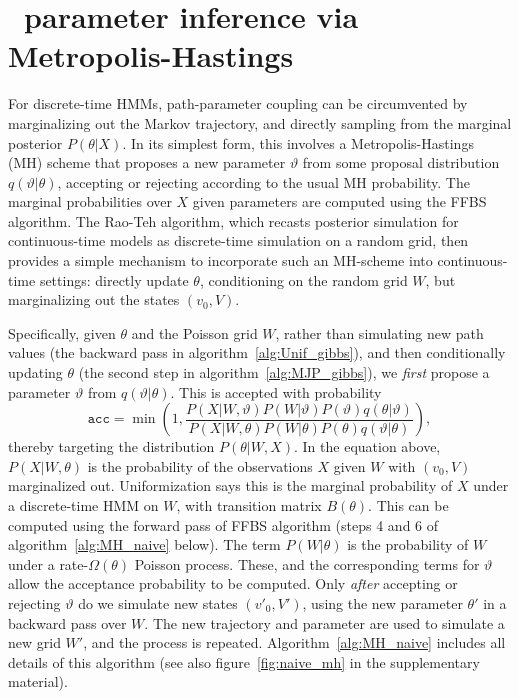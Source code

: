 \vspace{-.2in}
\section{\Naive\ parameter inference via Metropolis-Hastings}
For discrete-time HMMs, path-parameter coupling can be circumvented by marginalizing out the Markov trajectory, and directly sampling from the marginal posterior $P(\theta|X)$.
In its simplest form, this involves a Metropolis-Hastings (MH) scheme that proposes a new parameter $\vartheta$ from some proposal distribution $q(\vartheta|\theta)$, accepting or rejecting according to the usual MH probability.
The marginal probabilities over $X$ given parameters are computed using the FFBS algorithm.
The Rao-Teh algorithm, which recasts posterior simulation for continuous-time models as discrete-time simulation on a random grid, then provides a simple mechanism to incorporate such an MH-scheme into continuous-time settings: directly update $\theta$, conditioning on the random grid $W$, but marginalizing out the states $(v_0, V)$.

Specifically, given $\theta$ and the Poisson grid $W$, rather than simulating new path values (the backward pass in algorithm~\ref{alg:Unif_gibbs}), and then conditionally updating $\theta$ (the second step in algorithm~\ref{alg:MJP_gibbs}), we {\em first} propose a parameter $\vartheta$ from $q(\vartheta|\theta)$. This is accepted with probability 
$$ \texttt{acc} = \min\left(1, 
\frac{P(X|W,\vartheta) P(W|\vartheta)P(\vartheta)q(\theta|\vartheta)} {P(X|W,\theta) P(W|\theta)P(\theta)q(\vartheta|\theta)}\right),$$ 
thereby targeting the distribution $P(\theta|W,X)$.
In the equation above, $P(X|W,\theta)$ is the probability of the observations $X$ given $W$ with $(v_0,V)$ marginalized out. 
Uniformization says this is the marginal probability of $X$ under a discrete-time HMM on $W$, with transition matrix $B(\theta)$. This can be computed using the forward pass of FFBS algorithm (steps 4 and 6 of algorithm~\ref{alg:MH_naive} below). 
The term $P(W|\theta)$ is the probability of $W$ under a rate-$\Omega(\theta)$ Poisson process. 
These, and the corresponding terms for $\vartheta$ allow the acceptance probability to be computed.
Only {\em after} accepting or rejecting $\vartheta$ do we simulate new states $(v'_0,V')$, using the new parameter $\theta'$ in a backward pass over $W$. 
The new trajectory and parameter are used to simulate a new grid $W'$, and the process is repeated.
Algorithm~\ref{alg:MH_naive} includes all details of this algorithm (see also figure~\ref{fig:naive_mh} in the supplementary material).

